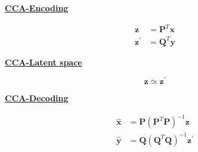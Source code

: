 \documentclass[aspectratio=169, usenames, dvipsnames]{beamer}
\begin{document}
\begin{frame}
  
  \vfill
  \begin{minipage}{.32\textwidth}
    \centering
    \underline{\textbf{CCA-Encoding}}
    
    \[
      \begin{aligned}
        \bm{z} & = \bm{P}^T \bm{x} \\
        \bm{z}^{\prime} & = \bm{Q}^T \bm{y}
      \end{aligned}
    \]
  \end{minipage}%
  \hfill
  \begin{minipage}{.32\textwidth}
    \begin{overprint}
      \centering
      \underline{\textbf{CCA-Latent space}}
      
      \[
        \bm{z} \simeq \bm{z}^{\prime}
      \]
    \end{overprint}
  \end{minipage}%
  \hfill
  \begin{minipage}{.32\textwidth}
    \begin{overprint}
      \centering
      \underline{\textbf{CCA-Decoding}}
      
      \[
        \begin{aligned}
          \hat{\bm{x}} & = \bm{P} \left( \bm{P}^T \bm{P} \right)^{-1} \bm{z} \\
          \hat{\bm{y}} & = \bm{Q} \left( \bm{Q}^T \bm{Q} \right)^{-1} \bm{z}^{\prime}
        \end{aligned}
      \]
    \end{overprint}
  \end{minipage}
  \vfill
\end{frame}
  
\end{document}

